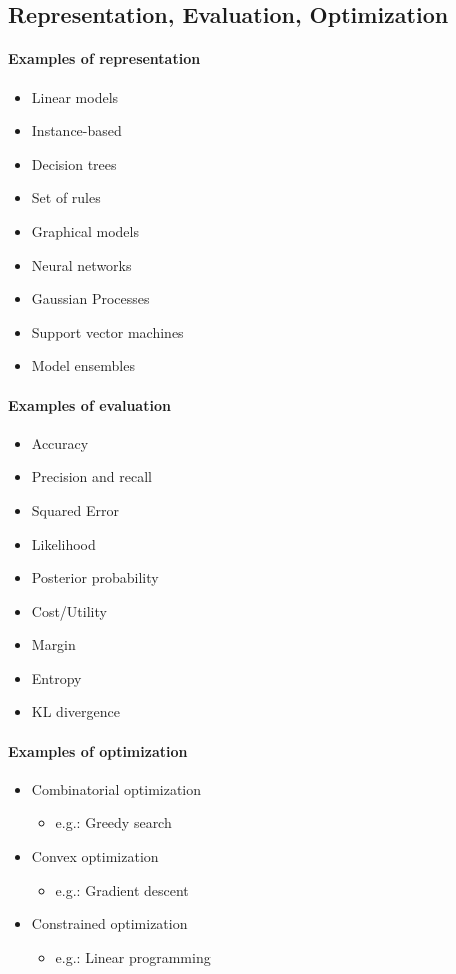 \documentclass{article}
\begin{document}
\subsection{Representation, Evaluation, Optimization}

\paragraph{Examples of representation}
\begin{itemize}
\item Linear models
\item Instance-based
\item Decision trees
\item Set of rules
\item Graphical models
\item Neural networks
\item Gaussian Processes
\item Support vector machines
\item Model ensembles
\end{itemize}

\paragraph{Examples of evaluation}
\begin{itemize}
\item Accuracy
\item Precision and recall
\item Squared Error
\item Likelihood
\item Posterior probability
\item Cost/Utility
\item Margin
\item Entropy
\item KL divergence
\end{itemize}

\paragraph{Examples of optimization}
\begin{itemize}
\item Combinatorial optimization
	\begin{itemize}
	\item e.g.: Greedy search
	\end{itemize}
\item Convex optimization
	\begin{itemize}
	\item e.g.: Gradient descent
	\end{itemize}
\item Constrained optimization
	\begin{itemize}
	\item e.g.: Linear programming
	\end{itemize}
\end{itemize}
\end{document}
